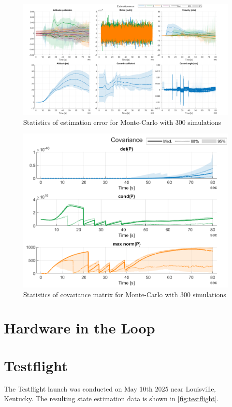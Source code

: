 \begin{figure}[ht]
    \centering
    \includegraphics[width=\linewidth]{images-results/result_stats_error_fixaccel_300.png}
    \caption{Statistics of estimation error for Monte-Carlo with 300 simulations}
    \label{fig:results_mc_stat_error}
\end{figure}
\begin{figure}[ht]
    \centering
    \includegraphics[width=0.65\linewidth]{images-results/result_stats_cov_fixaccel_300.png}
    \caption{Statistics of covariance matrix for Monte-Carlo with 300 simulations}
    \label{fig:results_mc_stat_cov}
\end{figure}



\section{Hardware in the Loop}

\clearpage
\section{Testflight}
The Testflight launch was conducted on May 10th 2025 near Louisville, Kentucky.
The resulting state estimation data is shown in \autoref{fig:testflight}.

